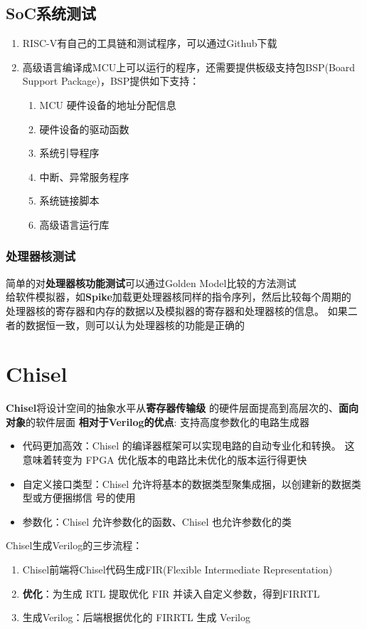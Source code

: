 \documentclass{article}
\begin{document}
\subsection{SoC系统测试}
\begin{enumerate}
    \item RISC-V有自己的工具链和测试程序，可以通过Github下载\cite{riscv3}
    \item 高级语言编译成MCU上可以运行的程序，还需要提供板级支持包BSP(Board Support Package)\cite{riscv1}，BSP提供如下支持：
    \begin{enumerate}
        \item MCU 硬件设备的地址分配信息
        \item 硬件设备的驱动函数
        \item 系统引导程序
        \item 中断、异常服务程序
        \item 系统链接脚本
        \item 高级语言运行库
    \end{enumerate}
\end{enumerate}
\subsubsection{处理器核测试}
简单的对\textbf{处理器核功能测试}可以通过Golden Model比较的方法测试\\ 
给软件模拟器，如\textbf{Spike}加载更处理器核同样的指令序列，然后比较每个周期的
处理器核的寄存器和内存的数据以及模拟器的寄存器和处理器核的信息\cite{riscv4}。 
如果二者的数据恒一致，则可以认为处理器核的功能是正确的

\section{Chisel}
\textbf{Chisel}将设计空间的抽象水平从\textbf{寄存器传输级} 的硬件层面提高到高层次的、\textbf{面向对象}的软件层面
\textbf{相对于Verilog的优点}: 支持高度参数化的电路生成器\cite{riscv2}
\begin{itemize}
    \item 代码更加高效：Chisel 的编译器框架可以实现电路的自动专业化和转换。 这意味着转变为 FPGA 优化版本的电路比未优化的版本运行得更快
    \item 自定义接口类型：Chisel 允许将基本的数据类型聚集成捆，以创建新的数据类型或方便捆绑信 号的使用
    \item 参数化：Chisel 允许参数化的函数、Chisel 也允许参数化的类
\end{itemize}
Chisel生成Verilog的三步流程：
\begin{enumerate}
    \item Chisel前端将Chisel代码生成FIR(Flexible Intermediate Representation)
    \item \textbf{优化}：为生成 RTL 提取优化 FIR 并读入自定义参数，得到FIRRTL
    \item 生成Verilog：后端根据优化的 FIRRTL 生成 Verilog
\end{enumerate}
\end{document}

